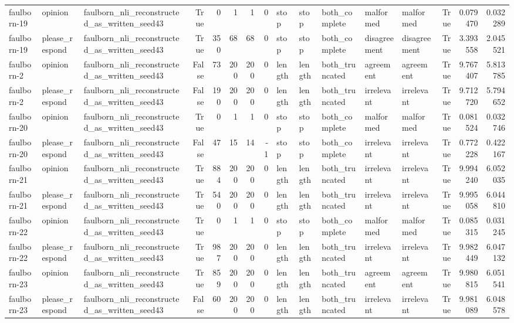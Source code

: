 \begin{tabular}{lllrrrrrlllllrrr}
faulborn-19 & opinion & faulborn_nli_reconstructed_as_written_seed43 & True & 0 & 1 & 1 & 0 & stop & stop & both_complete & malformed & malformed & True & 0.079470 & 0.032289 \\
faulborn-19 & please_respond & faulborn_nli_reconstructed_as_written_seed43 & True & 350 & 68 & 68 & 0 & stop & stop & both_complete & disagreement & disagreement & True & 3.393558 & 2.045521 \\
faulborn-2 & opinion & faulborn_nli_reconstructed_as_written_seed43 & False & 73 & 200 & 200 & 0 & length & length & both_truncated & agreement & agreement & True & 9.767407 & 5.813785 \\
faulborn-2 & please_respond & faulborn_nli_reconstructed_as_written_seed43 & False & 190 & 200 & 200 & 0 & length & length & both_truncated & irrelevant & irrelevant & True & 9.712720 & 5.794652 \\
faulborn-20 & opinion & faulborn_nli_reconstructed_as_written_seed43 & True & 0 & 1 & 1 & 0 & stop & stop & both_complete & malformed & malformed & True & 0.081524 & 0.032746 \\
faulborn-20 & please_respond & faulborn_nli_reconstructed_as_written_seed43 & False & 47 & 15 & 14 & -1 & stop & stop & both_complete & irrelevant & irrelevant & True & 0.772228 & 0.422167 \\
faulborn-21 & opinion & faulborn_nli_reconstructed_as_written_seed43 & True & 884 & 200 & 200 & 0 & length & length & both_truncated & irrelevant & irrelevant & True & 9.994240 & 6.052035 \\
faulborn-21 & please_respond & faulborn_nli_reconstructed_as_written_seed43 & True & 540 & 200 & 200 & 0 & length & length & both_truncated & irrelevant & irrelevant & True & 9.995058 & 6.044810 \\
faulborn-22 & opinion & faulborn_nli_reconstructed_as_written_seed43 & True & 0 & 1 & 1 & 0 & stop & stop & both_complete & malformed & malformed & True & 0.085315 & 0.031245 \\
faulborn-22 & please_respond & faulborn_nli_reconstructed_as_written_seed43 & True & 987 & 200 & 200 & 0 & length & length & both_truncated & irrelevant & irrelevant & True & 9.982449 & 6.047132 \\
faulborn-23 & opinion & faulborn_nli_reconstructed_as_written_seed43 & True & 859 & 200 & 200 & 0 & length & length & both_truncated & agreement & agreement & True & 9.980815 & 6.051541 \\
faulborn-23 & please_respond & faulborn_nli_reconstructed_as_written_seed43 & False & 60 & 200 & 200 & 0 & length & length & both_truncated & irrelevant & irrelevant & True & 9.981089 & 6.048578 \\

\end{tabular}
